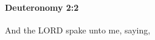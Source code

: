 
		\paragraph{Deuteronomy 2:2} %
			\label{DEUTERONOMY-2-2}

			And the LORD spake unto me, saying,


